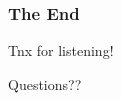 \documentclass[utf8]{beamer}
\begin{document}



\begin{frame}
	\frametitle{The End}
	\Huge{\centerline{Tnx for listening!}}
\end{frame}


\begin{frame}
\Huge{\centerline{Questions??}}
\end{frame}

\end{document}
